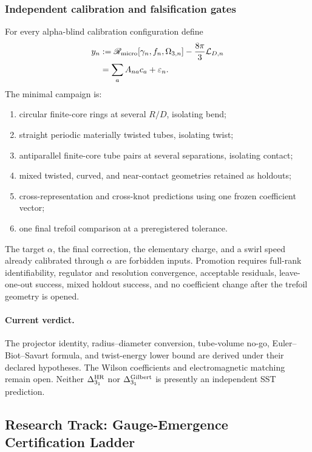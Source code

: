 \subsubsection{Independent calibration and falsification gates}

For every alpha-blind calibration configuration define
\begin{align}
    y_n
    &:=
    \mathscr R_{\rm micro}
    [\gamma_n,f_n,\Omega_{3,n}]
    -
    \frac{8\pi}{3}\mathcal L_{D,n}
    \nonumber\\
    &=
    \sum_a A_{na}c_a+\varepsilon_n.
    \label{eq:rt_alpha_calibration_equation_v0835}
\end{align}
The minimal campaign is:
\begin{enumerate}
    \item circular finite-core rings at several \(R/D\), isolating bend;
    \item straight periodic materially twisted tubes, isolating twist;
    \item antiparallel finite-core tube pairs at several separations,
    isolating contact;
    \item mixed twisted, curved, and near-contact geometries retained as
    holdouts;
    \item cross-representation and cross-knot predictions using one frozen
    coefficient vector;
    \item one final trefoil comparison at a preregistered tolerance.
\end{enumerate}
The target \(\alpha\), the final correction, the elementary charge, and a
swirl speed already calibrated through \(\alpha\) are forbidden inputs.
Promotion requires full-rank identifiability, regulator and resolution
convergence, acceptable residuals, leave-one-out success, mixed holdout
success, and no coefficient change after the trefoil geometry is opened.

\paragraph{Current verdict.}
The projector identity, radius--diameter conversion, tube-volume no-go,
Euler--Biot--Savart formula, and twist-energy lower bound are derived under
their declared hypotheses.  The Wilson coefficients and electromagnetic
matching remain open.  Neither
\(\Delta_{3_1}^{\rm HR}\) nor
\(\Delta_{3_1}^{\rm Gilbert}\) is presently an independent SST prediction.


\subsection{Research Track: Gauge-Emergence Certification Ladder}
\label{sec:rt_gauge_emergence_certification_ladder}

